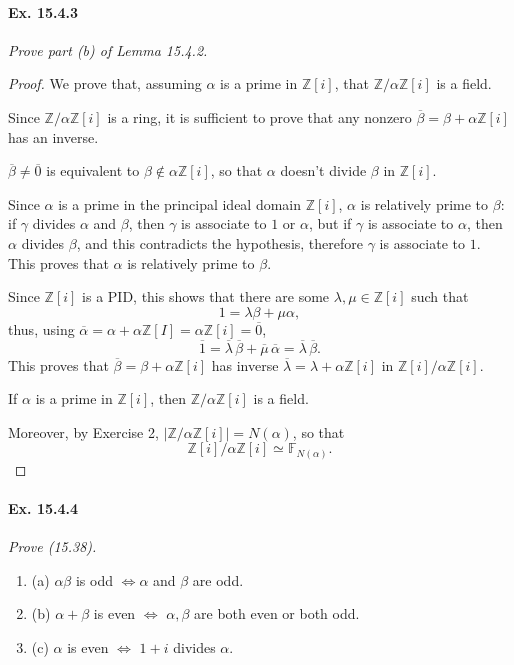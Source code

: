 \documentclass[11pt,a4paper]{article}
\newcommand{\be} {\begin{enumerate}}
\newcommand{\ee} {\end{enumerate}}
\newcommand{\Z}{\mathbb{Z}}
\newcommand{\F}{\mathbb{F}}
\begin{document}
\paragraph{Ex. 15.4.3}{\it Prove part (b) of Lemma 15.4.2.

}

\begin{proof} 
We prove that, assuming $\alpha$ is a prime in $\Z[i]$, that $\Z/\alpha\Z[i]$ is a field.

Since  $\Z/\alpha\Z[i]$ is a ring, it is sufficient to prove that any nonzero $\overline{\beta} = \beta + \alpha \Z[i]$ has an inverse.

$\overline{\beta} \ne \overline{0}$ is equivalent to $\beta \not \in \alpha \Z[i]$, so that $\alpha$ doesn't divide $\beta$ in $\Z[i]$. 

Since $\alpha$ is a prime in the principal ideal domain $\Z[i]$, $\alpha$ is relatively prime to $\beta$: if $\gamma$ divides $\alpha$ and $\beta$, then $\gamma$ is associate to $1$ or $\alpha$, but if $\gamma$ is associate to $\alpha$, then $\alpha$ divides $\beta$, and this contradicts the hypothesis, therefore $\gamma$ is associate to $1$. This proves that $\alpha$ is relatively prime to $\beta$.

Since $\Z[i]$ is a PID, this shows that there are some $\lambda, \mu \in \Z[i]$ such that
$$1 = \lambda \beta + \mu \alpha,$$
thus, using $\overline{\alpha} = \alpha + \alpha \Z[I] = \alpha \Z[i] = \overline{0}$,
$$\overline{1} = \overline{\lambda}\, \overline{\beta} + \overline{\mu}\, \overline{\alpha} = \overline{\lambda}\, \overline{\beta}.$$
This proves that $\overline{\beta} = \beta + \alpha \Z[i]$ has inverse $ \overline{\lambda} = \lambda + \alpha \Z[i]$ in $\Z[i]/\alpha\Z[i]$.

If $\alpha$ is a prime in $\Z[i]$, then $\Z/\alpha\Z[i]$ is a field.

Moreover, by Exercise 2,  $|\Z/\alpha\Z[i]| = N(\alpha)$, so that
$$\Z[i]/\alpha\Z[i] \simeq \F_{N(\alpha)}.$$
\end{proof} 

\paragraph{Ex. 15.4.4}{\it Prove (15.38).
\be
\item[(a)] $\alpha \beta$  is odd  $\iff \alpha$ and $\beta$ are odd.
\item[(b)] $\alpha + \beta$ is even $\iff$ $\alpha,\beta$ are both even or both odd.
\item[(c)] $\alpha$ is even $\iff$ $1+i$ divides $\alpha$.
\ee
}
\end{document}
